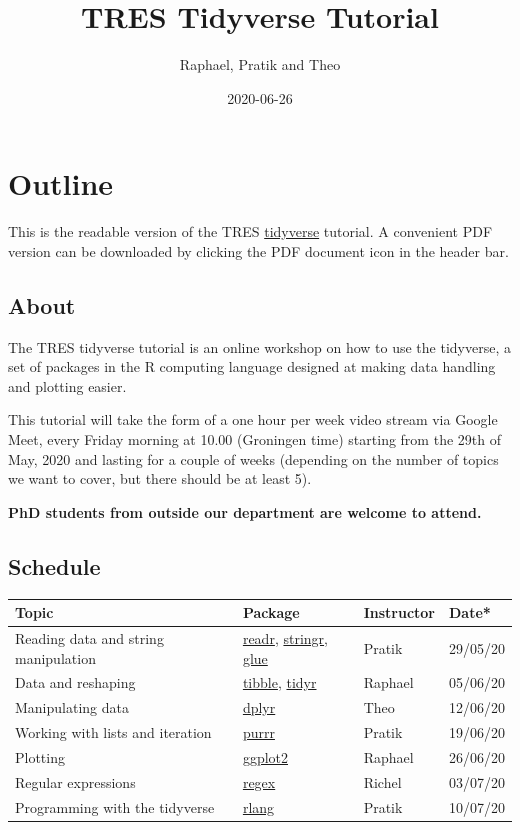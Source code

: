 \documentclass[]{book}
\title{TRES Tidyverse Tutorial}
\author{Raphael, Pratik and Theo}
\date{2020-06-26}
\begin{document}
\maketitle


\linenumbers

{
\setcounter{tocdepth}{1}
\tableofcontents
}
\hypertarget{outline}{%
\chapter*{Outline}\label{outline}}

This is the readable version of the TRES \href{https://www.tidyverse.org/}{tidyverse} tutorial. A convenient PDF version can be downloaded by clicking the PDF document icon in the header bar.

\hypertarget{about}{%
\section*{About}\label{about}}

The TRES tidyverse tutorial is an online workshop on how to use the tidyverse, a set of packages in the R computing language designed at making data handling and plotting easier.

This tutorial will take the form of a one hour per week video stream via Google Meet, every Friday morning at 10.00 (Groningen time) starting from the 29th of May, 2020 and lasting for a couple of weeks (depending on the number of topics we want to cover, but there should be at least 5).

\textbf{PhD students from outside our department are welcome to attend.}

\hypertarget{schedule}{%
\section*{Schedule}\label{schedule}}

\begin{longtable}[]{@{}llll@{}}
\toprule
Topic & Package & Instructor & Date*\tabularnewline
\midrule
\endhead
Reading data and string manipulation & \href{https://readr.tidyverse.org/}{readr}, \href{https://stringr.tidyverse.org/}{stringr}, \href{https://github.com/tidyverse/glue}{glue} & Pratik & 29/05/20\tabularnewline
Data and reshaping & \href{https://tibble.tidyverse.org/}{tibble}, \href{https://tidyr.tidyverse.org/}{tidyr} & Raphael & 05/06/20\tabularnewline
Manipulating data & \href{https://dplyr.tidyverse.org/}{dplyr} & Theo & 12/06/20\tabularnewline
Working with lists and iteration & \href{https://purrr.tidyverse.org/}{purrr} & Pratik & 19/06/20\tabularnewline
Plotting & \href{https://ggplot2.tidyverse.org/}{ggplot2} & Raphael & 26/06/20\tabularnewline
Regular expressions & \href{https://stat.ethz.ch/R-manual/R-devel/library/base/html/regex.html}{regex} & Richel & 03/07/20\tabularnewline
Programming with the tidyverse & \href{https://rlang.r-lib.org/}{rlang} & Pratik & 10/07/20\tabularnewline
\bottomrule
\end{longtable}
\end{document}
